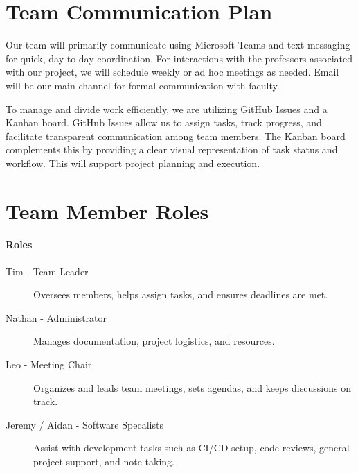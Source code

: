 \documentclass{article}
\begin{document}

\section{Team Communication Plan}

Our team will primarily communicate using Microsoft Teams and text messaging for quick, day-to-day coordination. For interactions with the professors associated with our project, we will schedule weekly or ad hoc meetings as needed. Email will be our main channel for formal communication with faculty.

To manage and divide work efficiently, we are utilizing GitHub Issues and a Kanban board. GitHub Issues allow us to assign tasks, track progress, and facilitate transparent communication among team members. The Kanban board complements this by providing a clear visual representation of task status and workflow. This will support project planning and execution.


\section{Team Member Roles}

\paragraph{Roles} 

\begin{description}
    \item[Tim - Team Leader] Oversees members, helps assign tasks, and ensures deadlines are met.
    \item[Nathan - Administrator] Manages documentation, project logistics, and resources.
    \item[Leo - Meeting Chair] Organizes and leads team meetings, sets agendas, and keeps discussions on track.
    \item[Jeremy / Aidan - Software Specalists] Assist with development tasks such as CI/CD setup, code reviews, general project support, and note taking.
\end{description}


\end{document}

